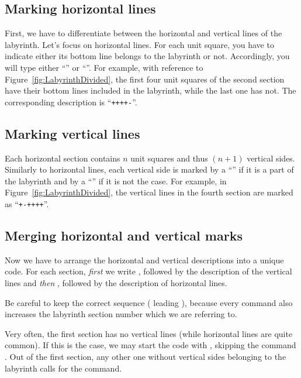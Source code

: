 \documentclass[a4paper,11pt,headinclude,footinclude]{scrartcl}
\def\ins{~}
\begin{document}
\subsection{Marking horizontal lines}
\label{hlines}

First, we have to differentiate between the horizontal and vertical lines of the labyrinth. Let's focus on horizontal lines. For each unit square, you have to indicate either its bottom line belongs to the labyrinth or not. Accordingly, you will type either “\othname{+}” or “\othname{-}”. For example, with reference to Figure\ins\ref{fig:LabyrinthDivided}, the first four unit squares of the second section have their bottom lines included in the labyrinth, while the last one has not. The corresponding description is “\texttt{++++-}”.

\subsection{Marking vertical lines}
\label{vlines}

Each horizontal section contains $n$ unit squares and thus $(n+1)$ vertical sides. Similarly to horizontal lines, each vertical side is marked by a “\othname{+}” if it is a part of the labyrinth and by a “\othname{-}” if it is not the case. For example, in Figure\ins\ref{fig:LabyrinthDivided}, the vertical lines in the fourth section are marked as “\texttt{+-++++}”. 

\subsection{Merging horizontal and vertical marks}
\label{sec:MarkWhole}

Now we have to arrange the horizontal and vertical descriptions into a unique code. For each section, \emph{first} we write , followed by the description of the vertical lines and \emph{then} , followed by the description of horizontal lines.

Be careful to keep the correct sequence ( leading ), because every  command also increases the labyrinth section number which we are referring to.

Very often, the first section has no vertical lines (while horizontal lines are quite common). If this is the case, we may start the code with , skipping the  command . Out of the first section, any other one without vertical sides belonging to the labyrinth calls for the  command. 
\end{document}
